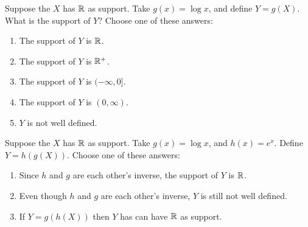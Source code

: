 \documentclass[poll_tutorial_format]{subfiles}
\begin{document}
\begin{exercise}
Suppose the $X$ has  $\mathbb{R}$ as support. Take $g(x) = \log x$, and define $Y = g(X)$. What is the support of $Y$?
Choose one of these answers:
\begin{enumerate}
\item The support of $Y$ is $\mathbb{R}$.
\item The support of $Y$ is $\mathbb{R}^+$.
\item The support of $Y$ is $(-\infty, 0]$.
\item The support of $Y$ is $(0, \infty)$.
\item $Y$ is not well defined.
\end{enumerate}

\end{exercise}

\begin{exercise}
Suppose the $X$ has  $\mathbb{R}$ as support. Take $g(x) = \log x$, and $h(x) = e^{x}$. Define $Y = h(g(X))$.
Choose one of these answers:
\begin{enumerate}
\item Since $h$ and $g$ are each other's inverse, the support of $Y$ is $\mathbb{R}$.
\item Even though $h$ and $g$ are each other's inverse, $Y$ is still not well defined.
\item If $Y=g(h(X))$ then $Y$ has can have $\mathbb{R}$ as support.
\end{enumerate}

\end{exercise}
\end{document}
